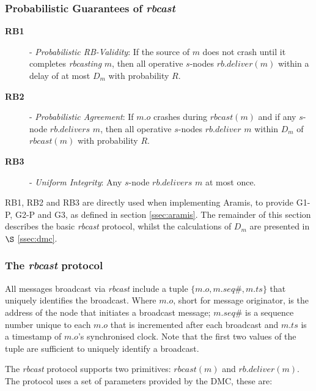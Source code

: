     \subsubsection*{Probabilistic Guarantees of \emph{rbcast}}
    
        \begin{description}
		    \item [\textbf{RB1}] - \emph{Probabilistic RB-Validity}: If the source of $m$ does not crash until it completes \emph{rbcasting} $m$, then all operative $s$-nodes $rb.deliver(m)$ within a delay of at most $D_m$ with probability $R$.  
		    
		    \item [\textbf{RB2}] - \emph{Probabilistic Agreement}: If $m.o$ crashes during $rbcast(m)$ and if any $s$-node $rb.delivers$ $m$, then all operative $s$-nodes $rb.deliver$ $m$ within $D_m$ of $rbcast(m)$ with probability $R$.  
		
		
		    \item [\textbf{RB3}] - \emph{Uniform Integrity}: Any $s$-node $rb.delivers$ $m$ at most once.  
\end{description}
    
    RB1, RB2 and RB3 are directly used when implementing \textsf{Aramis}, to provide G1-P, G2-P and G3, as defined in section \ref{ssec:aramis}.  The remainder of this section describes the basic \emph{rbcast} protocol, whilst the calculations of $D_m$ are presented in $\S$ \ref{ssec:dmc}.
    
    \subsubsection*{The \emph{rbcast} protocol}
    All messages broadcast via \emph{rbcast} include a tuple $\{m.o, m.seq\#, m.ts\}$ that uniquely identifies the broadcast.  Where $m.o$, short for message originator, is the address of the node that initiates a broadcast message; $m.seq\#$ is a sequence number unique to each $m.o$ that is incremented after each broadcast and $m.ts$ is a timestamp of $m.o$'s synchronised clock.  Note that the first two values of the tuple are sufficient to uniquely identify a broadcast.
    
    The \emph{rbcast} protocol supports two primitives: $rbcast(m)$ and $rb.deliver(m)$.  The protocol uses a set of parameters provided by the DMC, these are:
    
